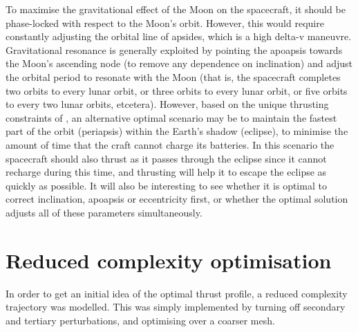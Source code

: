 To maximise the gravitational effect of the Moon on the spacecraft, it should be phase-locked with respect to the Moon's orbit. However, this would require constantly adjusting the orbital line of apsides, which is a high delta-v maneuvre. Gravitational resonance is generally exploited by pointing the apoapsis towards the Moon's ascending node (to remove any dependence on inclination) and adjust the orbital period to resonate with the Moon (that is, the spacecraft completes two orbits to every lunar orbit, or three orbits to every lunar orbit, or five orbits to every two lunar orbits, etcetera). However, based on the unique thrusting constraints of \BW, an alternative optimal scenario may be to maintain the fastest part of the orbit (periapsis) within the Earth's shadow (eclipse), to minimise the amount of time that the craft cannot charge its batteries. In this scenario the spacecraft should also thrust as it passes through the eclipse since it cannot recharge during this time, and thrusting will help it to escape the eclipse as quickly as possible. It will also be interesting to see whether it is optimal to correct inclination, apoapsis or eccentricity first, or whether the optimal solution adjusts all of these parameters simultaneously.
 

 

\section{Reduced complexity optimisation} \label{sec:Reduced-complexity}

In order to get an initial idea of the optimal thrust profile, a reduced complexity trajectory was modelled. This was simply implemented by turning off secondary and tertiary perturbations, and optimising over a coarser mesh. 


